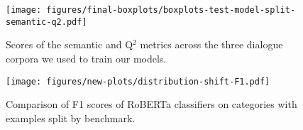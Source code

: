 \begin{figure*}[ht]
\centering
\texttt{[image: figures/final-boxplots/boxplots-test-model-split-semantic-q2.pdf]}
\caption{\small Scores of the semantic and Q$^2$ metrics across the three dialogue corpora we used to train our models.}
\label{fig:boxplots_by_dataset}
\end{figure*}

\begin{figure*}[ht]
\centering
\texttt{[image: figures/new-plots/distribution-shift-F1.pdf]}
\caption{\small Comparison of F1 scores of  RoBERTa classifiers on \begindata{} categories with examples split by benchmark. }
\label{fig:f1_by_dataset}
\end{figure*}


